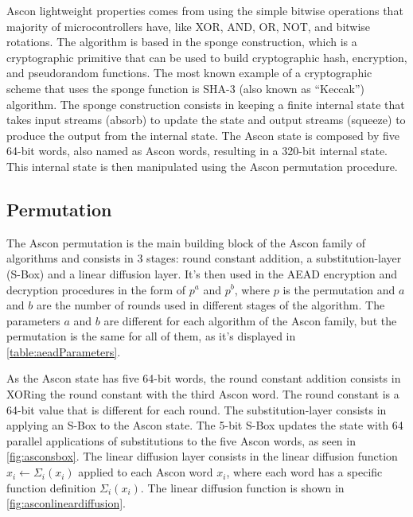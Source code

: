 \documentclass[11pt,twoside]{article}
\begin{document}
Ascon lightweight properties comes from using the simple bitwise operations that majority of microcontrollers have, like XOR, AND, OR, NOT, and bitwise rotations. The algorithm is based in the sponge construction, which is a cryptographic primitive that can be used to build cryptographic hash, encryption, and pseudorandom functions. The most known example of a cryptographic scheme that uses the sponge function is SHA-3 (also known as “Keccak”) \cite{bertoni2015keccak} algorithm. The sponge construction consists in keeping a finite internal state that takes input streams (absorb) to update the state and output streams (squeeze) to produce the output from the internal state. The Ascon state is composed by five 64-bit words, also named as Ascon words, resulting in a 320-bit internal state. This internal state is then manipulated using the Ascon permutation procedure.

\subsection{Permutation}

The Ascon permutation is the main building block of the Ascon family of algorithms and consists in 3 stages: round constant addition, a substitution-layer (S-Box) and a linear diffusion layer. It's then used in the AEAD encryption and decryption procedures in the form of $p^a$ and $p^b$, where $p$ is the permutation and $a$ and $b$ are the number of rounds used in different stages of the algorithm. The parameters $a$ and $b$ are different for each algorithm of the Ascon family, but the permutation is the same for all of them, as it's displayed in \cref{table:aeadParameters}.

As the Ascon state has five 64-bit words, the round constant addition consists in XORing the round constant with the third Ascon word. The round constant is a 64-bit value that is different for each round. The substitution-layer consists in applying an S-Box to the Ascon state. The 5-bit S-Box updates the state with 64 parallel applications of substitutions to the five Ascon words, as seen in \cref{fig:asconsbox}. The linear diffusion layer consists in the linear diffusion function $x_i \leftarrow \Sigma_i(x_i)$ applied to each Ascon word $x_i$, where each word has a specific function definition $\Sigma_i(x_i)$. The linear diffusion function is shown in \cref{fig:asconlineardiffusion}.
\end{document}
